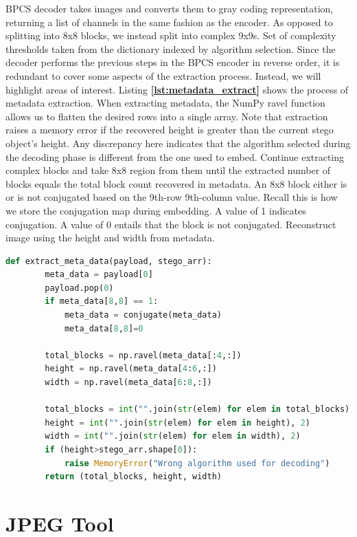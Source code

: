 \documentclass{l4proj}
\begin{document}
BPCS decoder takes images and converts them to gray coding representation, returning a list of channels in the same fashion as the encoder. As opposed to splitting into 8x8 blocks, we instead split into complex 9x9s. Set of complexity thresholds taken from the dictionary indexed by algorithm selection. Since the decoder performs the previous steps in the BPCS encoder in reverse order, it is redundant to cover some aspects of the extraction process. Instead, we will highlight areas of interest. Listing \textbf{\ref{lst:metadata_extract}} shows the process of metadata extraction. When extracting metadata, the NumPy ravel function \citep{ravel} allows us to flatten the desired rows into a single array. Note that extraction raises a memory error if the recovered height is greater than the current stego object's height. Any discrepancy here indicates that the algorithm selected during the decoding phase is different from the one used to embed. Continue extracting complex blocks and take 8x8 region from them until the extracted number of blocks equals the total block count recovered in metadata. An 8x8 block either is or is not conjugated based on the 9th-row 9th-column value. Recall this is how we store the conjugation map during embedding. A value of 1 indicates conjugation. A value of 0 entails that the block is not conjugated. Reconstruct image using the height and width from metadata.

\begin{lstlisting}[language=python, float, caption={Extraction of metadata by the BPCS tool decoder component}, label=lst:metadata_extract]
    def extract_meta_data(payload, stego_arr):
        meta_data = payload[0]  
        payload.pop(0)
        if meta_data[8,8] == 1:
            meta_data = conjugate(meta_data)
            meta_data[8,8]=0
            
        total_blocks = np.ravel(meta_data[:4,:])
        height = np.ravel(meta_data[4:6,:])
        width = np.ravel(meta_data[6:8,:])
        
        total_blocks = int("".join(str(elem) for elem in total_blocks), 2)
        height = int("".join(str(elem) for elem in height), 2)
        width = int("".join(str(elem) for elem in width), 2)
        if (height>stego_arr.shape[0]):
            raise MemoryError("Wrong algorithm used for decoding")
        return (total_blocks, height, width)
\end{lstlisting}

\section{JPEG Tool}\label{jpeg_implementation}
\end{document}
